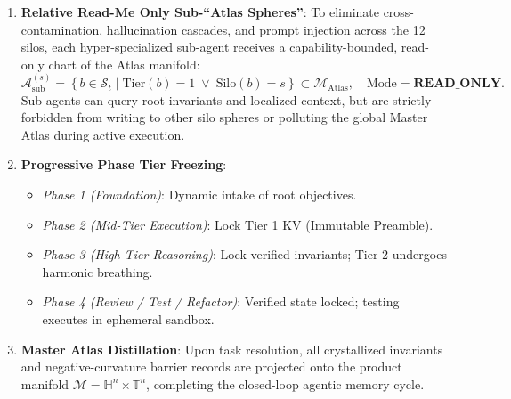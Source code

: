 \begin{enumerate}
    holding candidate hypotheses in un-collapsed geometric equilibrium while signaling a real-time \texttt{NUDGE} over the shared 2-way scratchboard until curvature realigns ($\kappa \ge 0.65, d < 1.2$).
    \item \textbf{Relative Read-Me Only Sub-``Atlas Spheres''}:
    To eliminate cross-contamination, hallucination cascades, and prompt injection across the 12 silos, each hyper-specialized sub-agent receives a capability-bounded, read-only chart of the Atlas manifold:
    \begin{equation}
        \mathcal{A}_{\text{sub}}^{(s)} = \left\{ b \in \mathcal{S}_t \mid \text{Tier}(b) = 1 \;\lor\; \text{Silo}(b) = s \right\} \subset \mathcal{M}_{\text{Atlas}}, \quad \text{Mode} = \textbf{READ\_ONLY}.
    \end{equation}
    Sub-agents can query root invariants and localized context, but are strictly forbidden from writing to other silo spheres or polluting the global Master Atlas during active execution.
    \item \textbf{Progressive Phase Tier Freezing}:
    \begin{itemize}
        \item \textit{Phase 1 (Foundation)}: Dynamic intake of root objectives.
        \item \textit{Phase 2 (Mid-Tier Execution)}: Lock Tier 1 KV (Immutable Preamble).
        \item \textit{Phase 3 (High-Tier Reasoning)}: Lock verified invariants; Tier 2 undergoes harmonic breathing.
        \item \textit{Phase 4 (Review / Test / Refactor)}: Verified state locked; testing executes in ephemeral sandbox.
    \end{itemize}
    \item \textbf{Master Atlas Distillation}:
    Upon task resolution, all crystallized invariants and negative-curvature barrier records are projected onto the product manifold $\mathcal{M} = \mathbb{H}^n \times \mathbb{T}^n$, completing the closed-loop agentic memory cycle.
\end{enumerate}
